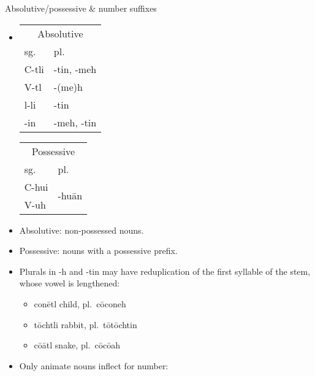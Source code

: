 \documentclass[12pt]{beamer}
\newcommand{\nah}[1]{\textcolor{nahgrn}{#1}}
\newcommand{\trs}[1]{\textcolor{nahblu}{#1}}
\begin{document}
\begin{frame}
\begin{columns}[t]
\begin{column}{.23\linewidth}
      \begin{block}{Absolutive/possessive \& number suffixes}
        \begin{itemize}
          \item
                \begin{tabular}[t]{ll}
                  \multicolumn{2}{c}{Absolutive} \\
                  sg.         & pl.              \\
                  \nah{C-tli} & \nah{-tin, -meh} \\
                  \nah{V-tl}  & \nah{-(me)h}     \\
                  \nah{l-li}  & \nah{-tin}       \\
                  \nah{-in}   & \nah{-meh, -tin} \\
                \end{tabular}%
                \qquad
                \begin{tabular}[t]{ll}
                  \multicolumn{2}{c}{Possessive }                                   \\
                  sg.         & pl.                                                 \\
                  \nah{C-hui} & \multicolumn{1}{l}{\multirow{2}[0]{*}{\nah{-huān}}} \\
                  \nah{V-uh}  &                                                     \\
                \end{tabular}%
          \item Absolutive: non-possessed nouns.
          \item Possessive: nouns with a possessive prefix.
          \item Plurals in \nah{-h} and \nah{-tin} may have reduplication of the first syllable of the stem, whose vowel is lengthened:
                \begin{itemize}
                  \item \nah{conētl} \trs{child}, pl.~\nah{cōconeh}
                  \item \nah{tōchtli} \trs{rabbit}, pl.~\nah{tōtōchtin}
                  \item \nah{cōātl} \trs{snake}, pl.~\nah{cōcōah}
                \end{itemize}
          \item Only animate nouns inflect for number:
                \begin{itemize}

\end{itemize}
\end{itemize}
\end{block}
\end{column}
\end{columns}
\end{frame}
\end{document}
